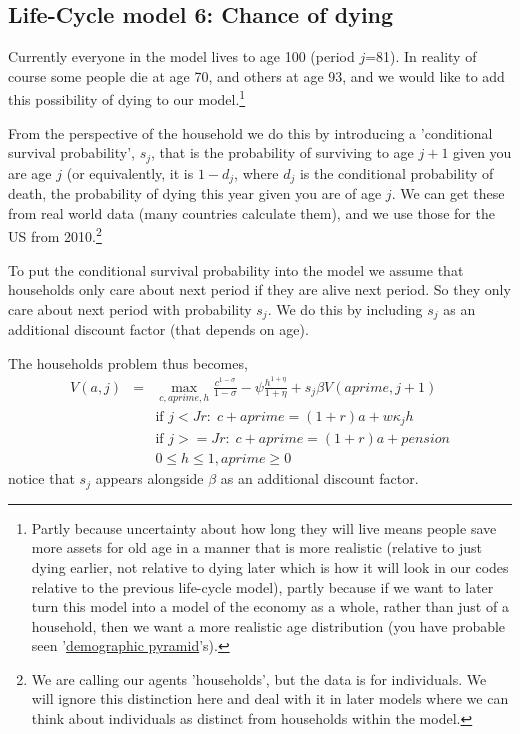 
\subsection{Life-Cycle model 6: Chance of dying}
Currently everyone in the model lives to age 100 (period $j$=81). In reality of course some people die at age 70, and others at age 93, and we would like to add this possibility of dying to our model.\footnote{Partly because uncertainty about how long they will live means people save more assets for old age in a manner that is more realistic (relative to just dying earlier, not relative to dying later which is how it will look in our codes relative to the previous life-cycle model), partly because if we want to later turn this model into a model of the economy as a whole, rather than just of a household, then we want a more realistic age distribution (you have probable seen '\href{https://en.wikipedia.org/wiki/Population_pyramid}{demographic pyramid}'s).}

From the perspective of the household we do this by introducing a 'conditional survival probability', $s_j$, that is the probability of surviving to age $j+1$ given you are age $j$ (or equivalently, it is $1-d_j$, where $d_j$ is the conditional probability of death, the probability of dying this year given you are of age $j$. We can get these from real world data (many countries calculate them), and we use those for the US from 2010.\footnote{We are calling our agents 'households', but the data is for individuals. We will ignore this distinction here and deal with it in later models where we can think about individuals as distinct from households within the model.}

To put the conditional survival probability into the model we assume that households only care about next period if they are alive next period. So they only care about next period with probability $s_j$. We do this by including $s_j$ as an additional discount factor (that depends on age).

The households problem thus becomes,
\begin{eqnarray*}
 V(a,j)&=& \max_{c,aprime,h} \frac{c^{1-\sigma}}{1-\sigma} - \psi \frac{h^{1+\eta}}{1+\eta}  + s_j \beta V(aprime,j+1) \\
&& \text{if }j<Jr: \; c+aprime=(1+r)a+w \kappa_j h \\
&& \text{if }j>=Jr: \; c+aprime=(1+r)a +pension\\
&& 0\leq h \leq 1, aprime\geq 0
\end{eqnarray*}
notice that $s_j$ appears alongside $\beta$ as an additional discount factor.

